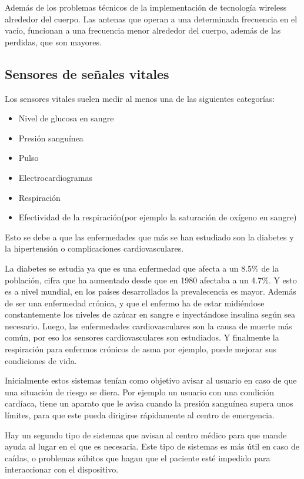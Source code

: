 \documentclass[12pt]{article}
\numberwithin{equation}{section}
\begin{document}
Además de los problemas técnicos de la implementación de tecnología wireless alrededor del cuerpo. Las antenas que operan a una determinada frecuencia en el vacío, funcionan a una frecuencia menor alrededor del cuerpo, además de las perdidas, que son mayores\cite{1-58053-493-7}.

\subsection{Sensores de señales vitales}

Los sensores vitales suelen medir al menos una de las siguientes categorías:

\begin{itemize}
\item Nivel de glucosa en sangre
\item Presión sanguínea
\item Pulso
\item Electrocardiogramas
\item Respiración
\item Efectividad de la respiración(por ejemplo la saturación de oxígeno en sangre)
\end{itemize}

Esto se debe a que las enfermedades que más se han estudiado son la diabetes y la hipertensión o complicaciones cardiovasculares.

La diabetes se estudia ya que es una enfermedad que afecta a un 8.5\% de la población, cifra que ha aumentado desde que en 1980 afectaba a un 4.7\%\cite{978924156525}. Y esto es a nivel mundial, en los países desarrollados la prevalecencia es mayor. Además de ser una enfermedad crónica, y que el enfermo ha de estar midiéndose constantemente los niveles de azúcar en sangre e inyectándose insulina según sea necesario. Luego, las enfermedades cardiovasculares son la causa de muerte más común, por eso los sensores cardiovasculares son estudiados. Y finalmente la respiración para enfermos crónicos de asma por ejemplo, puede mejorar sus condiciones de vida.


Inicialmente estos sistemas tenían como objetivo avisar al usuario en caso de que una situación de riesgo se diera. Por ejemplo un usuario con una condición cardíaca, tiene un aparato que le avisa cuando la presión sanguínea supera unos límites, para que este pueda dirigirse rápidamente al centro de emergencia.

Hay un segundo tipo de sistemas que avisan al centro médico para que mande ayuda al lugar en el que es necesaria. Este tipo de sistemas es más útil en caso de caídas, o problemas súbitos que hagan que el paciente esté impedido para interaccionar con el dispositivo.
\end{document}
